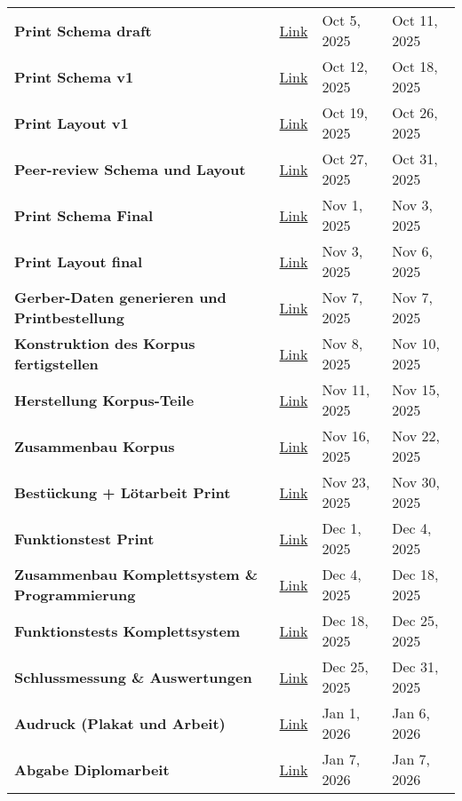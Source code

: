 \begin{table}[H]
\begin{tabularx}{412pt}{|l|l|l|l|}
		\textbf{Print Schema draft} & \href{https://github.com/Violabitch5/Nathophone\_elec/issues/4}{Link} & Oct 5, 2025 & Oct 11, 2025 \\ 
		\textbf{Print Schema v1} & \href{https://github.com/Violabitch5/Nathophone\_elec/issues/5}{Link} & Oct 12, 2025 & Oct 18, 2025 \\ 
		\textbf{Print Layout v1} & \href{https://github.com/Violabitch5/Nathophone\_elec/issues/6}{Link} & Oct 19, 2025 & Oct 26, 2025 \\ 
		\textbf{Peer-review Schema und Layout} & \href{https://github.com/Violabitch5/Nathophone\_elec/issues/7}{Link} & Oct 27, 2025 & Oct 31, 2025 \\ 
		\textbf{Print Schema Final} & \href{https://github.com/Violabitch5/Nathophone\_elec/issues/8}{Link} & Nov 1, 2025 & Nov 3, 2025 \\ 
		\textbf{Print Layout final} & \href{https://github.com/Violabitch5/Nathophone\_elec/issues/9}{Link} & Nov 3, 2025 & Nov 6, 2025 \\ 
		\textbf{Gerber-Daten generieren und Printbestellung} & \href{https://github.com/Violabitch5/Nathophone\_elec/issues/10}{Link} & Nov 7, 2025 & Nov 7, 2025 \\ 
		\textbf{Konstruktion des Korpus fertigstellen} & \href{https://github.com/Violabitch5/Nathophone\_mech/issues/1}{Link} & Nov 8, 2025 & Nov 10, 2025 \\ 
		\textbf{Herstellung Korpus-Teile} & \href{https://github.com/Violabitch5/Nathophone\_mech/issues/2}{Link} & Nov 11, 2025 & Nov 15, 2025 \\ 
		\textbf{Zusammenbau Korpus} & \href{https://github.com/Violabitch5/Nathophone\_mech/issues/3}{Link} & Nov 16, 2025 & Nov 22, 2025 \\ 
		\textbf{Bestückung + Lötarbeit Print} & \href{https://github.com/Violabitch5/Nathophone\_elec/issues/11}{Link} & Nov 23, 2025 & Nov 30, 2025 \\ 
		\textbf{Funktionstest Print} & \href{https://github.com/Violabitch5/Nathophone\_elec/issues/12}{Link} & Dec 1, 2025 & Dec 4, 2025 \\ 
		\textbf{Zusammenbau Komplettsystem \& Programmierung} & \href{https://github.com/Violabitch5/Nathophone\_mech/issues/4}{Link} & Dec 4, 2025 & Dec 18, 2025 \\ 
		\textbf{Funktionstests Komplettsystem} & \href{https://github.com/Violabitch5/Nathophone\_elec/issues/13}{Link} & Dec 18, 2025 & Dec 25, 2025 \\ 
		\textbf{Schlussmessung \& Auswertungen} & \href{https://github.com/Violabitch5/Nathophone\_elec/issues/14}{Link} & Dec 25, 2025 & Dec 31, 2025 \\ 
		\hdashline
		\textbf{Audruck (Plakat und Arbeit)} & \href{https://github.com/Violabitch5/Nathophone\_doc/issues/8}{Link} & Jan 1, 2026 & Jan 6, 2026 \\ 
		\textbf{Abgabe Diplomarbeit} & \href{https://github.com/Violabitch5/Nathophone\_doc/issues/2}{Link} & Jan 7, 2026 & Jan 7, 2026
	\end{tabularx}
	\label{terminplan}
\end{table}